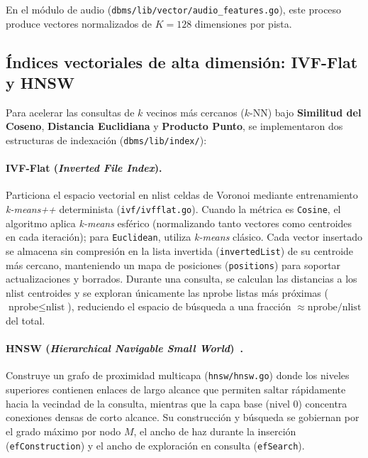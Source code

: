 \documentclass[11pt,a4paper]{article}
\begin{document}
En el módulo de audio (\texttt{dbms/lib/vector/audio\_features.go}), este proceso produce vectores normalizados de $K = 128$ dimensiones por pista.

\subsection{Índices vectoriales de alta dimensión: IVF-Flat y HNSW}

Para acelerar las consultas de $k$ vecinos más cercanos ($k$-NN) bajo \textbf{Similitud del Coseno}, \textbf{Distancia Euclidiana} y \textbf{Producto Punto}, se implementaron dos estructuras de indexación (\texttt{dbms/lib/index/}):

\paragraph{IVF-Flat (\emph{Inverted File Index}).}
Particiona el espacio vectorial en $\text{nlist}$ celdas de Voronoi mediante entrenamiento \emph{k-means++} determinista (\texttt{ivf/ivfflat.go}). Cuando la métrica es \texttt{Cosine}, el algoritmo aplica \emph{k-means} esférico (normalizando tanto vectores como centroides en cada iteración); para \texttt{Euclidean}, utiliza \emph{k-means} clásico. Cada vector insertado se almacena sin compresión en la lista invertida (\texttt{invertedList}) de su centroide más cercano, manteniendo un mapa de posiciones (\texttt{positions}) para soportar actualizaciones y borrados. Durante una consulta, se calculan las distancias a los $\text{nlist}$ centroides y se exploran únicamente las $\text{nprobe}$ listas más próximas ($\text{nprobe} \le \text{nlist}$), reduciendo el espacio de búsqueda a una fracción $\approx \text{nprobe}/\text{nlist}$ del total.

\paragraph{HNSW (\emph{Hierarchical Navigable Small World})~\cite{malkov2020}.}
Construye un grafo de proximidad multicapa (\texttt{hnsw/hnsw.go}) donde los niveles superiores contienen enlaces de largo alcance que permiten saltar rápidamente hacia la vecindad de la consulta, mientras que la capa base (nivel 0) concentra conexiones densas de corto alcance. Su construcción y búsqueda se gobiernan por el grado máximo por nodo $M$, el ancho de haz durante la inserción (\texttt{efConstruction}) y el ancho de exploración en consulta (\texttt{efSearch}).
\end{document}
